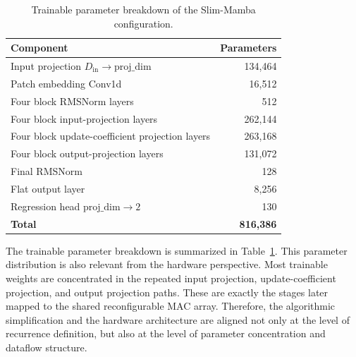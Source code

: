 \documentclass[lettersize,journal]{IEEEtran}
\begin{document}
\begin{table}[!t]
\caption{Trainable parameter breakdown of the Slim-Mamba configuration.}
\label{tab:slim_param_breakdown_tcas}
\begin{center}
\footnotesize
\setlength{\tabcolsep}{6pt}
\renewcommand{\arraystretch}{1.08}
\begin{tabular}{|l|r|}
\hline
\textbf{Component} & \textbf{Parameters} \\
\hline
Input projection \(D_{\mathrm{in}}\rightarrow\text{proj\_dim}\) & 134,464 \\
\hline
Patch embedding Conv1d & 16,512 \\
\hline
Four block RMSNorm layers & 512 \\
\hline
Four block input-projection layers & 262,144 \\
\hline
Four block update-coefficient projection layers & 263,168 \\
\hline
Four block output-projection layers & 131,072 \\
\hline
Final RMSNorm & 128 \\
\hline
Flat output layer & 8,256 \\
\hline
Regression head \(\text{proj\_dim}\rightarrow 2\) & 130 \\
\hline
\textbf{Total} & \textbf{816,386} \\
\hline
\end{tabular}
\end{center}
\end{table}

The trainable parameter breakdown is summarized in
Table~\ref{tab:slim_param_breakdown_tcas}. This parameter distribution is also
relevant from the hardware perspective. Most
trainable weights are concentrated in the repeated input projection, update-coefficient
projection, and output projection paths. These are exactly the stages later
mapped to the shared reconfigurable MAC array. Therefore, the algorithmic
simplification and the hardware architecture are aligned not only at the level
of recurrence definition, but also at the level of parameter concentration and
dataflow structure.


\end{document}
